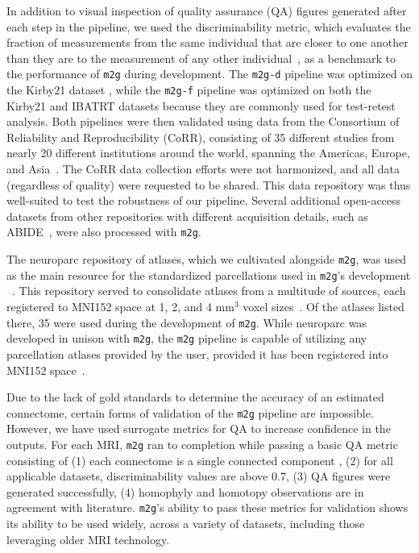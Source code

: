 In addition to visual inspection of quality assurance (QA) figures generated after each step in the pipeline, we used the discriminability metric, which evaluates the fraction of measurements from the same individual that are closer to one another than they are to the measurement of any other individual~\cite{discriminability}, as a benchmark to the performance of \texttt{m2g} during development. The \texttt{m2g-d} pipeline was optimized on the Kirby21 dataset \cite{Kirby21}, while the \texttt{m2g-f} pipeline was optimized on both the Kirby21 and IBATRT \cite{ibatrt} datasets because they are commonly used for test-retest analysis. Both pipelines were then validated using data from the Consortium of Reliability and Reproducibility (CoRR), consisting of 35 different studies from nearly 20 different institutions around the world, spanning the Americas, Europe, and Asia~\cite{corr}. The CoRR data collection efforts were not harmonized, and all data (regardless of quality) were requested to be shared. This data repository was thus well-suited to test the robustness of our pipeline. Several additional open-access datasets from other repositories with different acquisition details, such as ABIDE~\cite{abide1, abide2}, were also processed with \texttt{m2g}.

The neuroparc repository of atlases, which we cultivated alongside \texttt{m2g}, was used as the main resource for the standardized parcellations used in \texttt{m2g}'s development ~\cite{neuroparc}. This repository served to consolidate atlases from a multitude of sources, each registered to MNI152 space at 1, 2, and 4 mm$^3$ voxel sizes~\cite{mni152}. Of the atlases listed there, 35 were used during the development of \texttt{m2g}. While neuroparc was developed in unison with \texttt{m2g}, the \texttt{m2g} pipeline is capable of utilizing any parcellation atlases provided by the user, provided it has been registered into MNI152 space~\cite{mni152}.

Due to the lack of gold standards to determine the accuracy of an estimated connectome, %
certain forms of validation of the \texttt{m2g} pipeline are impossible. 
However, we have used surrogate metrics for QA to increase confidence in the outputs. For each MRI, \texttt{m2g} ran to completion while passing a basic QA metric consisting of (1) each connectome is a single connected component%
, (2) for all applicable datasets, discriminability values are above 0.7, (3) QA figures were generated successfully, (4) homophyly and homotopy observations are in agreement with literature. \texttt{m2g}'s ability to pass these metrics for validation shows its ability to be used widely, across a variety of datasets, including those leveraging older MRI technology.


